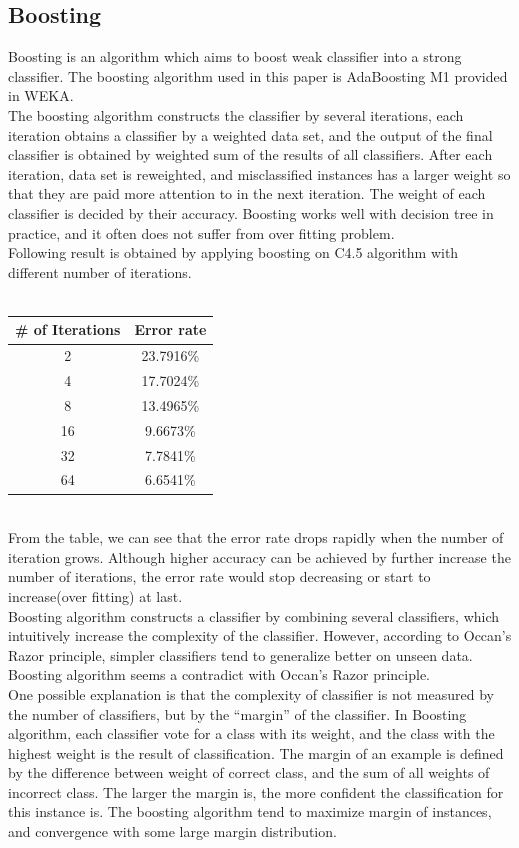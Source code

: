 \documentclass[a4paper,11pt]{article}
\begin{document}
\subsection{Boosting}
Boosting is an algorithm which aims to boost weak classifier into a strong classifier. The boosting algorithm used in this paper is AdaBoosting M1 provided in WEKA.\\
The boosting algorithm constructs the classifier by several iterations, each iteration obtains a classifier by a weighted data set, and the output of the final classifier is obtained by weighted sum of the results of all classifiers. After each iteration, data set is reweighted, and misclassified instances has a larger weight so that they are paid more attention to in the next iteration. The weight of each classifier is decided by their accuracy. Boosting works well with decision tree in practice, and it often does not suffer from over fitting problem.\\
Following result is obtained by applying boosting on C4.5 algorithm with different number of iterations.\\
\vspace{0.5cm}\\
\begin{tabular}{c c}
\# of Iterations	& Error rate\\
\hline \hline
	2		& 23.7916\%\\
	4		& 17.7024\%\\
	8		& 13.4965\%\\
	16		& 9.6673\%\\
    32      & 7.7841\%\\
    64      & 6.6541\%\\
\end{tabular}
\vspace{0.5cm}\\
From the table, we can see that the error rate drops rapidly when the number of iteration grows. Although higher accuracy can be achieved by further increase the number of iterations, the error rate would stop decreasing or start to increase(over fitting) at last.\\
Boosting algorithm constructs a classifier by combining several classifiers, which intuitively increase the complexity of the classifier. However, according to Occan's Razor principle, simpler classifiers tend to generalize better on unseen data. Boosting algorithm seems a contradict with Occan's Razor principle.\\
One possible explanation is that the complexity of classifier is not measured by the number of classifiers, but by the ``margin'' of the classifier.
In Boosting algorithm, each classifier vote for a class with its weight, and the class with the highest weight is the result of classification. The margin of an example is defined by the difference between weight of correct class, and the sum of all weights of incorrect class. The larger the margin is, the more confident the classification for this instance is. The boosting algorithm tend to maximize margin of instances, and convergence with some large margin distribution\cite{boosting}.\\
\end{document}
